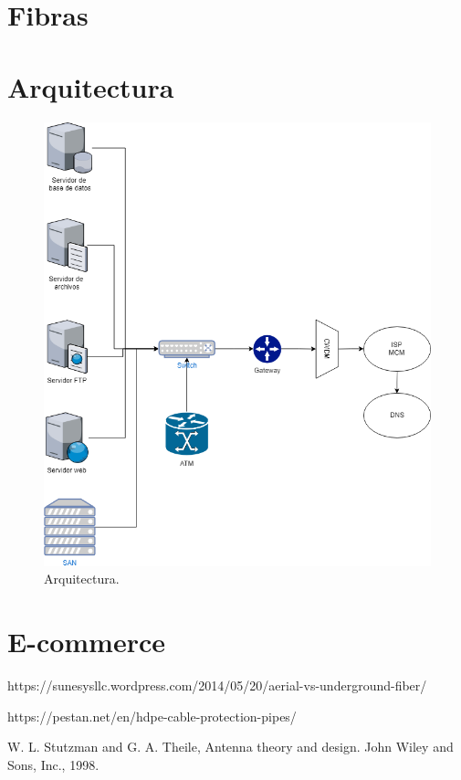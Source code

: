 \documentclass[12pt,letterpaper]{article}
\begin{document}
\newpage
\section{Fibras}

\newpage
\section{Arquitectura}
\begin{figure}[ht]
    \centering
    \includegraphics[width=.75\textwidth]{f16.png}
    \caption{Arquitectura.}
\end{figure}

\newpage
\section{E-commerce}


\newpage
\begin{thebibliography}{20}
    https://sunesysllc.wordpress.com/2014/05/20/aerial-vs-underground-fiber/

    https://pestan.net/en/hdpe-cable-protection-pipes/
    

    W. L. Stutzman and G. A. Theile, Antenna theory and design. John Wiley and Sons, Inc., 1998.
\end{thebibliography}
\end{document}
